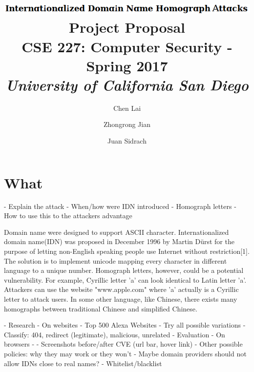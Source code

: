\documentclass[letterpaper,twocolumn,10pt]{article}
\begin{document}
\date{}

\title{\Large \textbf{
\includegraphics[height=\baselineskip]{title} \\
Project Proposal } \\ \vspace{0.025 in} \large \normalfont
CSE 227: Computer Security - Spring 2017 \\ \textit{
University of California San Diego
}}

\author{
{\rm Chen Lai}\\
\and
{\rm Zhongrong Jian}\\
\and
{\rm Juan Sidrach}\\
}

\maketitle

\section{What}

- Explain the attack
  - When/how were IDN introduced
  - Homograph letters
  - How to use this to the attackers advantage

Domain name were designed to support ASCII character. Internationalized domain name(IDN) was proposed in December 1996 by Martin Dürst for the purpose of letting non-English speaking people use Internet without restriction[1]. The solution is to implement unicode mapping every character in different language to a unique number. Homograph letters, however, could be a potential vulnerability. For example, Cyrillic letter 'a' can look identical to Latin letter 'a'. Attackers can use the website "www.apple.com" where 'a' actually is a Cyrillic letter to attack users. In some other language, like Chinese, there exists many homographs between traditional Chinese and simplified Chinese.

- Research
  - On websites
    - Top 500 Alexa Websites
    - Try all possible variations
    - Classify: 404, redirect (legitimate), malicious, unrelated
    - Evaluation
  - On browsers
    - %
    - Screenshots before/after CVE (url bar, hover link)
    - Other possible policies: why they may work or they won't
      - Maybe domain providers should not allow IDNs close to real names?
      - Whitelist/blacklist
\end{document}
